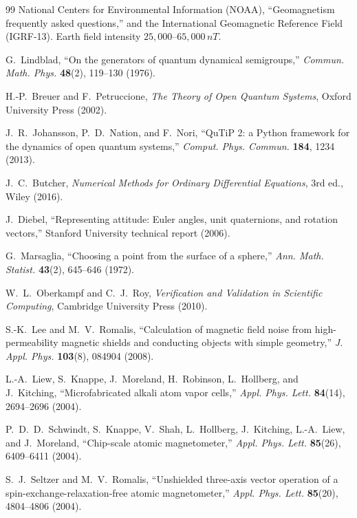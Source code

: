\documentclass[11pt]{article}
\newcommand{\nT}{\,nT}\newcommand{\pT}{\,pT}\newcommand{\fT}{\,fT}
\begin{document}
\begin{thebibliography}{99}
 National Centers for Environmental Information (NOAA),
``Geomagnetism frequently asked questions,'' and the International Geomagnetic
Reference Field (IGRF-13). Earth field intensity $25{,}000$--$65{,}000\nT$.

 G.~Lindblad, ``On the generators of quantum dynamical
semigroups,'' \emph{Commun. Math. Phys.} \textbf{48}(2), 119--130 (1976).

 H.-P.~Breuer and F.~Petruccione, \emph{The Theory of Open
Quantum Systems}, Oxford University Press (2002).

 J.~R.~Johansson, P.~D.~Nation, and F.~Nori, ``QuTiP 2: a
Python framework for the dynamics of open quantum systems,'' \emph{Comput. Phys.
Commun.} \textbf{184}, 1234 (2013).

 J.~C.~Butcher, \emph{Numerical Methods for Ordinary
Differential Equations}, 3rd ed., Wiley (2016).

 J.~Diebel, ``Representing attitude: Euler angles, unit
quaternions, and rotation vectors,'' Stanford University technical report (2006).

 G.~Marsaglia, ``Choosing a point from the surface of a
sphere,'' \emph{Ann. Math. Statist.} \textbf{43}(2), 645--646 (1972).

 W.~L.~Oberkampf and C.~J.~Roy, \emph{Verification and
Validation in Scientific Computing}, Cambridge University Press (2010).

 S.-K.~Lee and M.~V.~Romalis, ``Calculation of magnetic field
noise from high-permeability magnetic shields and conducting objects with simple
geometry,'' \emph{J. Appl. Phys.} \textbf{103}(8), 084904 (2008).

 L.-A.~Liew, S.~Knappe, J.~Moreland, H.~Robinson, L.~Hollberg,
and J.~Kitching, ``Microfabricated alkali atom vapor cells,'' \emph{Appl. Phys.
Lett.} \textbf{84}(14), 2694--2696 (2004).

 P.~D.~D.~Schwindt, S.~Knappe, V.~Shah, L.~Hollberg,
J.~Kitching, L.-A.~Liew, and J.~Moreland, ``Chip-scale atomic magnetometer,''
\emph{Appl. Phys. Lett.} \textbf{85}(26), 6409--6411 (2004).

 S.~J.~Seltzer and M.~V.~Romalis, ``Unshielded three-axis
vector operation of a spin-exchange-relaxation-free atomic magnetometer,''
\emph{Appl. Phys. Lett.} \textbf{85}(20), 4804--4806 (2004).


\end{thebibliography}
\end{document}
